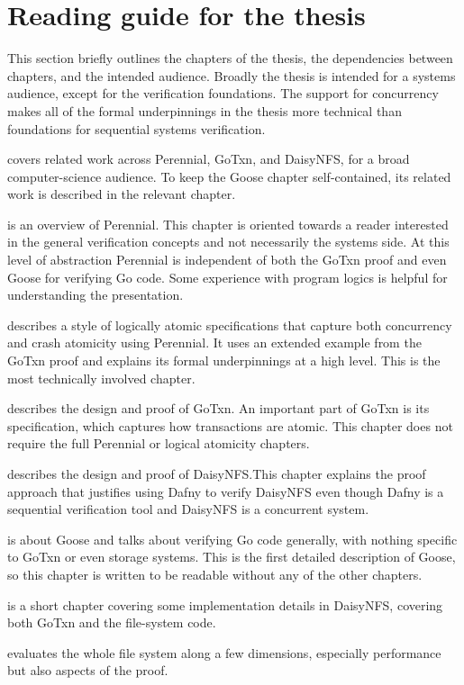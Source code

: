 
\section{Reading guide for the thesis}
\label{sec:intro:reading-guide}

This section briefly outlines the chapters of the thesis, the dependencies
between chapters, and the intended audience. Broadly the thesis is intended for
a systems audience, except for the verification foundations. The support for
concurrency makes all of the formal underpinnings in the thesis more technical
than foundations for sequential systems verification.

 covers related work across Perennial, GoTxn, and DaisyNFS, for
a broad computer-science audience. To keep the Goose chapter self-contained, its
related work is described in the relevant chapter.

 is an overview of Perennial. This chapter is oriented
towards a reader interested in the general verification concepts and not
necessarily the systems side. At this level of abstraction Perennial is
independent of both the GoTxn proof and even Goose for verifying Go code. Some
experience with program logics is helpful for understanding the presentation.

 describes a style of logically atomic specifications
that capture both concurrency and crash atomicity using Perennial. It uses an
extended example from the GoTxn proof and explains its formal underpinnings at a
high level. This is the most technically involved chapter.

 describes the design and proof of GoTxn. An important part of GoTxn is its
specification, which captures how transactions are atomic. This chapter does not
require the full Perennial or logical atomicity chapters.

 describes the design and proof of DaisyNFS.\@ This chapter
explains the proof approach that justifies using Dafny to verify DaisyNFS even
though Dafny is a sequential verification tool and DaisyNFS is a concurrent
system.

 is about Goose and talks about verifying Go code generally, with
nothing specific to GoTxn or even storage systems. This is the first detailed
description of Goose, so this chapter is written to be readable without any of
the other chapters.

 is a short chapter covering some implementation details in
DaisyNFS, covering both GoTxn and the file-system code.

 evaluates the whole file system along a few dimensions,
especially performance but also aspects of the proof.
